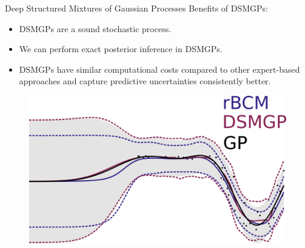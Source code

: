 \begin{frame}{Deep Structured Mixtures of Gaussian Processes}
Benefits of DSMGPs:
\begin{itemize}
    \item DSMGPs are a sound stochastic process.
    \item We can perform exact posterior inference in DSMGPs.
    \item DSMGPs have similar computational costs compared to other expert-based approaches and capture predictive uncertainties consistently better.
\end{itemize}

\begin{figure}
  \centering
  \includegraphics[width=0.5\linewidth]{comparison}
\end{figure}
\end{frame}
